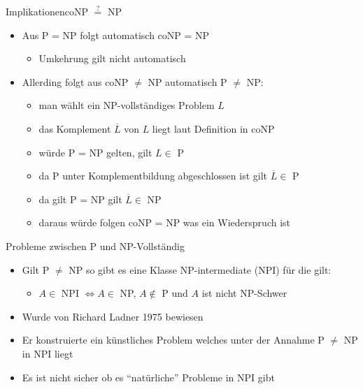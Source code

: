 \documentclass[ignorenonframetext,]{beamer}
\begin{document}
\begin{frame}{Implikationen}{coNP $\stackrel{?}{=}$ NP}

\begin{itemize}
\itemsep1pt\parskip0pt
\item
  Aus P = NP folgt automatisch coNP = NP

  \begin{itemize}
  \itemsep1pt\parskip0pt
  \item
    Umkehrung gilt nicht automatisch
  \end{itemize}
\item
  Allerding folgt aus coNP $\neq$ NP automatisch P $\neq$ NP:

  \begin{itemize}
  \itemsep1pt\parskip0pt
  \item
    man wählt ein NP-vollständiges Problem $L$
  \item
    das Komplement $\overline{L}$ von $L$ liegt laut Definition in coNP
  \item
    würde P = NP gelten, gilt $L \in$ P
  \item
    da P unter Komplementbildung abgeschlossen ist gilt
    $\overline{L} \in$ P
  \item
    da gilt P = NP gilt $\overline{L} \in$ NP
  \item
    daraus würde folgen coNP = NP was ein Wiederspruch ist
  \end{itemize}
\end{itemize}

\end{frame}

\begin{frame}{Probleme zwischen P und NP-Vollständig}

\begin{itemize}
\itemsep1pt\parskip0pt
\item
  Gilt P $\neq$ NP so gibt es eine Klasse NP-intermediate (NPI) für die
  gilt:

  \begin{itemize}
  \itemsep1pt\parskip0pt
  \item
    $A \in$ NPI $\Leftrightarrow A \in$ NP, $A \notin$ P und $A$ ist
    nicht NP-Schwer
  \end{itemize}
\item
  Wurde von Richard Ladner 1975 bewiesen
\item
  Er konstruierte ein künstliches Problem welches unter der Annahme P
  $\neq$ NP in NPI liegt
\item
  Es ist nicht sicher ob es ``natürliche'' Probleme in NPI gibt
\end{itemize}

\end{frame}
\end{document}
